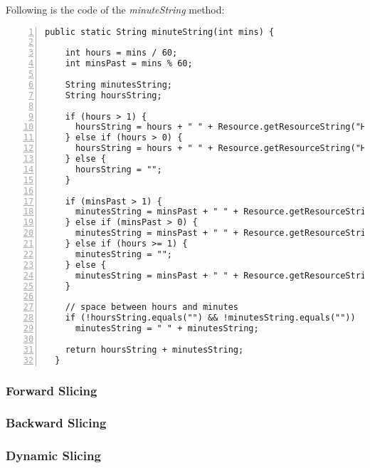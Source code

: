 \documentclass[fontsize=12pt,paper=letter,twoside]{scrartcl}
\begin{document}
\noindent Following is the code of the \emph{minuteString} method:
\begin{lstlisting}[numbers=left]
  public static String minuteString(int mins) {
    
    int hours = mins / 60;
    int minsPast = mins % 60;
    
    String minutesString;
    String hoursString;
    
    if (hours > 1) {
      hoursString = hours + " " + Resource.getResourceString("Hours");
    } else if (hours > 0) {
      hoursString = hours + " " + Resource.getResourceString("Hour");
    } else {
      hoursString = "";
    }

    if (minsPast > 1) {
      minutesString = minsPast + " " + Resource.getResourceString("Minutes");
    } else if (minsPast > 0) {
      minutesString = minsPast + " " + Resource.getResourceString("Minute");
    } else if (hours >= 1) {
      minutesString = "";
    } else {
      minutesString = minsPast + " " + Resource.getResourceString("Minutes");
    }

    // space between hours and minutes
    if (!hoursString.equals("") && !minutesString.equals(""))
      minutesString = " " + minutesString;

    return hoursString + minutesString;
  }
\end{lstlisting}

\subsubsection{Forward Slicing}


\subsubsection{Backward Slicing}


\subsubsection{Dynamic Slicing}
\end{document}
